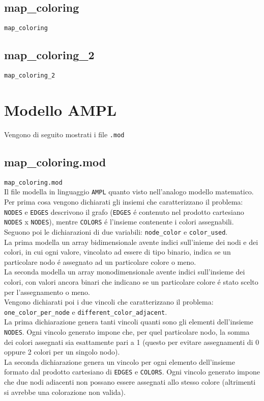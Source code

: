 \documentclass{article}
\begin{document}
\subsection{map\_coloring}
\texttt{map\_coloring}
\pagebreak

\subsection{map\_coloring\_2}
\texttt{map\_coloring\_2}
\pagebreak

\section{Modello AMPL}
Vengono di seguito mostrati i file \texttt{.mod}

\subsection{map\_coloring.mod}
\texttt{map\_coloring.mod}
\\

Il file modella in linguaggio \texttt{AMPL} quanto visto nell'analogo modello matematico.\\
Per prima cosa vengono dichiarati gli insiemi che caratterizzano il problema: \texttt{NODES} e \texttt{EDGES} descrivono il grafo (\texttt{EDGES} \'e contenuto nel prodotto cartesiano \texttt{NODES} x \texttt{NODES}), mentre \texttt{COLORS} \'e l'insieme contenente i colori assegnabili.\\

Seguono poi le dichiarazioni di due variabili: \texttt{node\_color} e \texttt{color\_used}.\\
La prima modella un array bidimensionale avente indici sull'inieme dei nodi e dei colori, in cui ogni valore, vincolato ad essere di tipo binario, indica se un particolare nodo \'e assegnato ad un particolare colore o meno.\\
La seconda modella un array monodimensionale avente indici sull'insieme dei colori, con valori ancora binari che indicano se un particolare colore \'e stato scelto per l'assegnamento o meno.\\ 

Vengono dichiarati poi i due vincoli che caratterizzano il problema: \texttt{one\_color\_per\_node} e \texttt{different\_color\_adjacent}.\\
La prima dichiarazione genera tanti vincoli quanti sono gli elementi dell'insieme \texttt{NODES}. Ogni vincolo generato impone che, per quel particolare nodo, la somma dei colori assegnati sia esattamente pari a 1 (questo per evitare assegnamenti di 0 oppure 2 colori per un singolo nodo).\\
La seconda dichiarazione genera un vincolo per ogni elemento dell'insieme formato dal prodotto cartesiano di \texttt{EDGES} e \texttt{COLORS}. Ogni vincolo generato impone che due nodi adiacenti non possano essere assegnati allo stesso colore (altrimenti si avrebbe una colorazione non valida).\\
\end{document}
